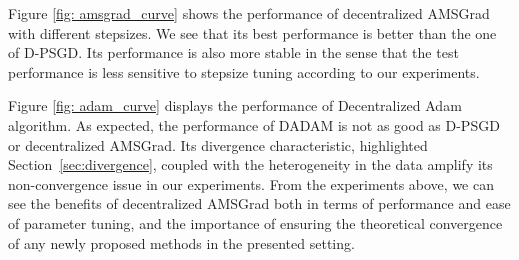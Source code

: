\documentclass[anon,12pt]{colt2021} %
\begin{document}



Figure \ref{fig: amsgrad_curve} shows the performance of decentralized AMSGrad with different stepsizes.
We see that its best performance is better than the one of D-PSGD.
Its performance is also more stable in the sense that the test performance is less sensitive to stepsize tuning according to our experiments.


Figure \ref{fig: adam_curve} displays the performance of Decentralized Adam algorithm.
As expected, the performance of DADAM is not as good as D-PSGD or decentralized AMSGrad.
Its divergence characteristic, highlighted Section~\ref{sec:divergence}, coupled with the heterogeneity in the data amplify its non-convergence issue in our experiments. 
From the experiments above, we can see the benefits of decentralized AMSGrad both in terms of performance and ease of parameter tuning, and the importance of ensuring the theoretical convergence of any newly proposed methods in the presented setting. 



\end{document}

